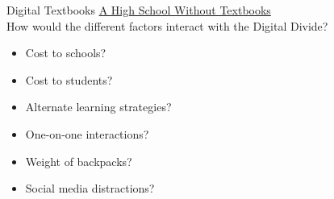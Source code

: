 \documentclass{beamer}
\begin{document}
\begin{frame}{Digital Textbooks}
\href{http://www.youtube.com/watch?v=UB2RXPqFgdI}{A High School Without Textbooks}\\
\bigskip
How would the different factors interact with the Digital Divide?
\begin{itemize}
\item Cost to schools?
\item Cost to students?
\item Alternate learning strategies?
\item One-on-one interactions?
\item Weight of backpacks?
\item Social media distractions?
\end{itemize}
\end{frame}
\end{document}
